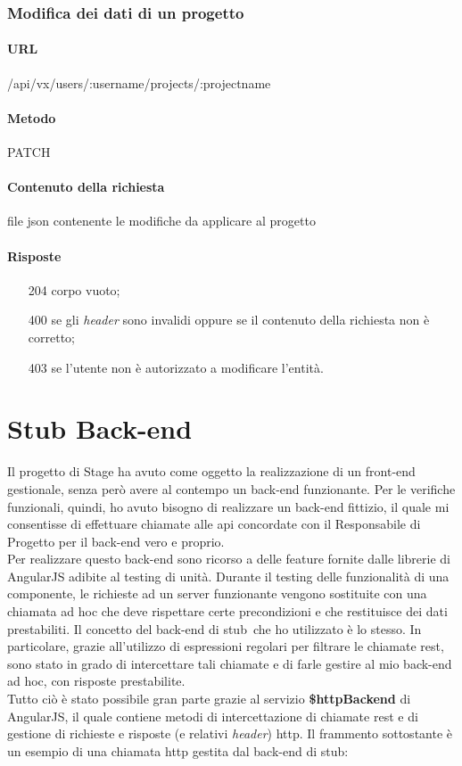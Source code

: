 \subsubsection{Modifica dei dati di un progetto}
\paragraph{URL}
/api/vx/users/:username/projects/:projectname
\paragraph{Metodo}
PATCH
\paragraph{Contenuto della richiesta}
file \gls{json} contenente le modifiche da applicare al progetto
\paragraph{Risposte}
\begin{itemize}
	\item[204] corpo vuoto;
	\item[400] se gli \emph{header} sono invalidi oppure se il contenuto della richiesta non è corretto;
	\item[403] se l'utente non è autorizzato a modificare l'entità.
\end{itemize}



\section{Stub Back-end}
Il progetto di Stage ha avuto come oggetto la realizzazione di un \gls{front-end} gestionale, senza però avere al contempo un \gls{back-end} funzionante. Per le verifiche funzionali, quindi, ho avuto bisogno di realizzare un \gls{back-end} fittizio, il quale mi consentisse di effettuare chiamate alle \gls{api} concordate con il Responsabile di Progetto per il \gls{back-end} vero e proprio.\\
Per realizzare questo \gls{back-end} sono ricorso a delle feature fornite dalle librerie di AngularJS adibite al testing di unità. Durante il testing delle funzionalità di una componente, le richieste ad un server funzionante vengono sostituite con una chiamata ad hoc che deve rispettare certe precondizioni e che restituisce dei dati prestabiliti. Il concetto del \gls{back-end} di \gls{stub}\glsfirstoccur\  che ho utilizzato è lo stesso. In particolare, grazie all'utilizzo di espressioni regolari per filtrare le chiamate \gls{rest}, sono stato in grado di intercettare tali chiamate e di farle gestire al mio \gls{back-end} ad hoc, con risposte prestabilite.\\
Tutto ciò è stato possibile gran parte grazie al servizio \textbf{\$httpBackend} di AngularJS, il quale contiene metodi di intercettazione di chiamate \gls{rest} e di gestione di richieste e risposte (e relativi \emph{header}) \gls{http}. Il frammento sottostante è un esempio di una chiamata \gls{http} gestita dal \gls{back-end} di \gls{stub}:

